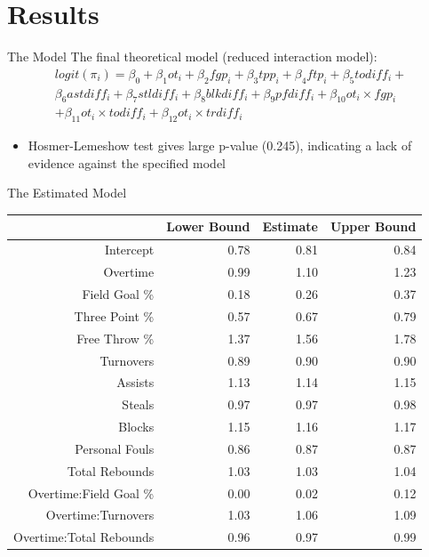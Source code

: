 \documentclass{beamer}
\begin{document}
\section{Results}

	\begin{frame}{The Model}
	The final theoretical model (reduced interaction model): 
	\begin{multline*}
	logit(\pi_{i})=\beta_{0}+\beta_{1}ot_{i}+\beta_{2}fgp_{i}+\beta_{3}tpp_{i}+\beta_{4}ftp_{i}+\beta_{5}todiff_{i}+\\
	\beta_{6}astdiff_{i}+\beta_{7}stldiff_{i}+\beta_{8}blkdiff_{i}+\beta_{9}pfdiff_{i}+\beta_{10}ot_{i}\times fgp_{i}\\
	+\beta_{11}ot_{i}\times todiff_{i}+\beta_{12}ot_{i}\times trdiff_{i}
	\end{multline*}
\begin{itemize}
	\item Hosmer-Lemeshow test gives large p-value (0.245), indicating a lack of evidence against the specified model
\end{itemize}
\end{frame}	

\begin{frame}{The Estimated Model}
\begin{table}[ht]
	\centering
	\begin{tabular}{rrrr}
		\hline
		& Lower Bound & Estimate & Upper Bound \\ 
		\hline
		Intercept & 0.78 & 0.81 & 0.84 \\ 
		Overtime & 0.99 & 1.10 & 1.23 \\ 
		Field Goal \% & 0.18 & 0.26 & 0.37 \\ 
		Three Point \% & 0.57 & 0.67 & 0.79 \\ 
		Free Throw \% & 1.37 & 1.56 & 1.78 \\ 
		Turnovers & 0.89 & 0.90 & 0.90 \\ 
		Assists & 1.13 & 1.14 & 1.15 \\ 
		Steals & 0.97 & 0.97 & 0.98 \\ 
		Blocks & 1.15 & 1.16 & 1.17 \\ 
		Personal Fouls & 0.86 & 0.87 & 0.87 \\ 
		Total Rebounds & 1.03 & 1.03 & 1.04 \\ 
		Overtime:Field Goal \% & 0.00 & 0.02 & 0.12 \\ 
		Overtime:Turnovers & 1.03 & 1.06 & 1.09 \\ 
		Overtime:Total Rebounds & 0.96 & 0.97 & 0.99 \\ 
		\hline
	\end{tabular}
\end{table}
\end{frame}	
\end{document}
